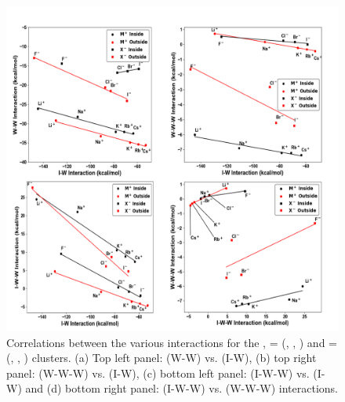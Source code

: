 \begin{figure}[H]
    \centering
    \includegraphics[width=.9\textwidth]{Figures/Chapter_3/figure_9_combined.png}
  \caption[Correlations between the various interactions for the ,  =  (, , ) and  =  (, , ) clusters. (a) Top left panel: (W-W) vs. (I-W), (b) top right panel: (W-W-W) vs. (I-W), (c) bottom left panel: (I-W-W) vs. (I-W) and (d) bottom right panel: (I-W-W) vs. (W-W-W) interactions.]{Correlations between the various interactions for the ,  =  (, , ) and  =  (, , ) clusters. (a) Top left panel: (W-W) vs. (I-W), (b) top right panel: (W-W-W) vs. (I-W), (c) bottom left panel: (I-W-W) vs. (I-W) and (d) bottom right panel: (I-W-W) vs. (W-W-W) interactions.}
  \label{fig:MBE_II_9}
\end{figure}